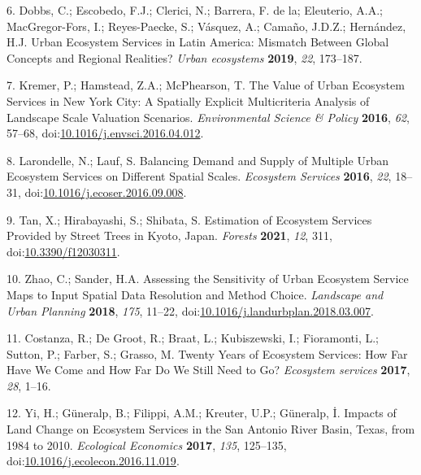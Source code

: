 \documentclass[
]{article}
\begin{document}
\leavevmode\hypertarget{ref-dobbs_urban_2019}{}%
6. Dobbs, C.; Escobedo, F.J.; Clerici, N.; Barrera, F. de la; Eleuterio, A.A.; MacGregor-Fors, I.; Reyes-Paecke, S.; Vásquez, A.; Camaño, J.D.Z.; Hernández, H.J. Urban Ecosystem Services in Latin America: Mismatch Between Global Concepts and Regional Realities? \emph{Urban ecosystems} \textbf{2019}, \emph{22}, 173--187.

\leavevmode\hypertarget{ref-kremer_value_2016}{}%
7. Kremer, P.; Hamstead, Z.A.; McPhearson, T. The Value of Urban Ecosystem Services in New York City: A Spatially Explicit Multicriteria Analysis of Landscape Scale Valuation Scenarios. \emph{Environmental Science \& Policy} \textbf{2016}, \emph{62}, 57--68, doi:\href{https://doi.org/10.1016/j.envsci.2016.04.012}{10.1016/j.envsci.2016.04.012}.

\leavevmode\hypertarget{ref-larondelle_balancing_2016}{}%
8. Larondelle, N.; Lauf, S. Balancing Demand and Supply of Multiple Urban Ecosystem Services on Different Spatial Scales. \emph{Ecosystem Services} \textbf{2016}, \emph{22}, 18--31, doi:\href{https://doi.org/10.1016/j.ecoser.2016.09.008}{10.1016/j.ecoser.2016.09.008}.

\leavevmode\hypertarget{ref-tan_estimation_2021}{}%
9. Tan, X.; Hirabayashi, S.; Shibata, S. Estimation of Ecosystem Services Provided by Street Trees in Kyoto, Japan. \emph{Forests} \textbf{2021}, \emph{12}, 311, doi:\href{https://doi.org/10.3390/f12030311}{10.3390/f12030311}.

\leavevmode\hypertarget{ref-zhao_assessing_2018}{}%
10. Zhao, C.; Sander, H.A. Assessing the Sensitivity of Urban Ecosystem Service Maps to Input Spatial Data Resolution and Method Choice. \emph{Landscape and Urban Planning} \textbf{2018}, \emph{175}, 11--22, doi:\href{https://doi.org/10.1016/j.landurbplan.2018.03.007}{10.1016/j.landurbplan.2018.03.007}.

\leavevmode\hypertarget{ref-costanza_twenty_2017}{}%
11. Costanza, R.; De Groot, R.; Braat, L.; Kubiszewski, I.; Fioramonti, L.; Sutton, P.; Farber, S.; Grasso, M. Twenty Years of Ecosystem Services: How Far Have We Come and How Far Do We Still Need to Go? \emph{Ecosystem services} \textbf{2017}, \emph{28}, 1--16.

\leavevmode\hypertarget{ref-yi_impacts_2017}{}%
12. Yi, H.; Güneralp, B.; Filippi, A.M.; Kreuter, U.P.; Güneralp, İ. Impacts of Land Change on Ecosystem Services in the San Antonio River Basin, Texas, from 1984 to 2010. \emph{Ecological Economics} \textbf{2017}, \emph{135}, 125--135, doi:\href{https://doi.org/10.1016/j.ecolecon.2016.11.019}{10.1016/j.ecolecon.2016.11.019}.
\end{document}
